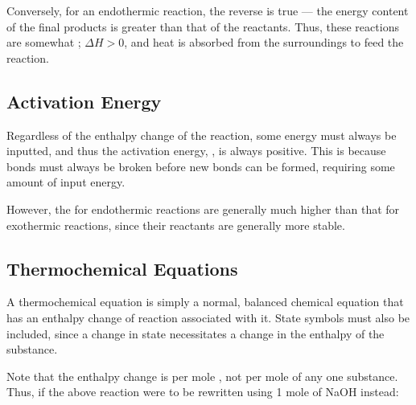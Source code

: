 		Conversely, for an endothermic reaction, the reverse is true --- the energy content of the final products is greater than that
		of the reactants. Thus, these reactions are somewhat ; $\Delta H > 0$, and heat is absorbed
		from the surroundings to feed the reaction.


		\subsection{Activation Energy}

			Regardless of the enthalpy change of the reaction, some energy must always be inputted, and thus the activation energy, \ea{}, is
			always positive. This is because bonds must always be broken before new bonds can be formed, requiring some amount of input energy.

			However, the \ea{} for endothermic reactions are generally much higher than that for exothermic reactions, since their reactants
			are generally more stable.


		\subsection{Thermochemical Equations}

			A thermochemical equation is simply a normal, balanced chemical equation that has an enthalpy change of reaction associated with
			it. State symbols must also be included, since a change in state necessitates a change in the enthalpy of the substance.


			Note that the enthalpy change is per mole , not per mole of any one substance. Thus, if the above reaction
			were to be rewritten using 1 mole of NaOH instead:


